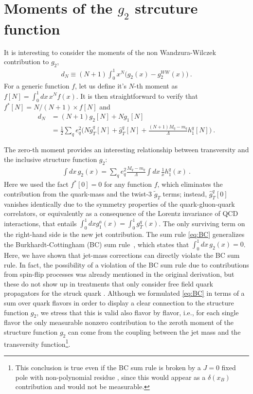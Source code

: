 \documentclass[preprintnumbers,floatfix,nofootinbib]{revtex4}
\newcommand{\xbj}{{x_B}}                   %
\newcommand{\mj}{M_q}
\newcommand{\mq}{m_q}
\begin{document}
\section{Moments of the $g_2$ strcuture function}

It is interesting to consider the moments of the non Wandzura-Wilczek contribution to $g_2$,
\begin{align}
  d_N \equiv (N+1) \int_0^1 x^N \bigg( g_2(x) - g_2^{WW}(x) \bigg) \ .
\end{align}
For a generic function $f$, let us define it's $N$-th moment as $f[N]=\int_0^1 dx\, x^{N} f(x)$. It is then straightforward to verify that $f^*[N] = N/(N+1) \times f[N]$ and  
\begin{align}
  d_N & = (N+1) g_2[N] + N g_1[N] \\
  & = \frac12 \sum_q e_q^2 \bigg( N \tilde g_T^q[N] + \hat g_T^q[N]
    + \frac{(N+1) \mj-\mq}{\Lambda} h_1^q[N] \bigg) \ .
\end{align}

The zero-th moment provides an interesting relationship between transversity
and the inclusive structure function $g_2$:
\begin{align}
  \label{eq:BC}
  \int dx\, g_2(x) = \sum_q e_q^2 \frac{\mj-\mq}{\Lambda} \int dx\, \frac{1}{x} h_1^q(x) \ .
\end{align}
Here we used the fact $f^*[0]=0$ for any function $f$, which eliminates the contribution from the quark-mass and the twist-3 $\widetilde g_T$ terms; instead, $\widehat g_T^q[0]$ vanishes identically due to the symmetry
properties of the quark-gluon-quark correlators, or equivalently as a consequence of the Lorentz invariance of QCD interactions, that entails $\int_0^1 dx g_1^a(x) = \int_0^1 g_T^q(x)$. The only surviving term on the right-hand side is the new jet contribution.
The sum rule \eqref{eq:BC}
generalizes the Burkhardt-Cottingham (BC) sum rule~\cite{Burkhardt:1970ti},
which states that  $\int_0^1 dx\, g_2(x) =0$. 
Here, we have shown that jet-mass corrections can directly violate the BC sum rule.
In fact, the possibility of a violation of the BC sum rule due to 
contributions from spin-flip processes was already mentioned in the original
derivation, but these do not show up in treatments that only
consider free field quark propagators for the struck quark
\cite{Jaffe:1996zw}.  Although we formulated \eqref{eq:BC} in terms of a sum over quark flavors in order to display a clear
connection to the structure function $g_2$, we stress that this is valid also
flavor by flavor, i.e., for each single flavor the only measurable nonzero contribution to the zeroth moment of the
structure function $g_2$ can come from the coupling between the jet mass and the transversity function\footnote{This conclusion is true even if the BC sum rule is broken by a $J = 0$ fixed pole with
non-polynomial residue \cite{Jaffe:1996zw}, since this would appear as a
$\delta(\xbj)$ contribution and would not be measurable.}.
\end{document}
